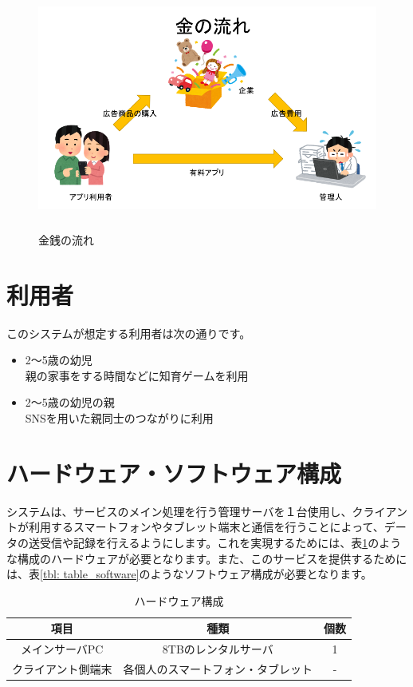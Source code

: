 \documentclass[a4j]{jarticle}
\begin{document}
\begin{figure}[H]
  \begin{center}
    \includegraphics[width = 14cm, height = 8cm]{section5_money.png}
    \caption{金銭の流れ}
    \label{money}
  \end{center}
\end{figure}

\section{利用者}
このシステムが想定する利用者は次の通りです。

\begin{itemize}
\item 2～5歳の幼児\\
  親の家事をする時間などに知育ゲームを利用
\item 2～5歳の幼児の親\\
  SNSを用いた親同士のつながりに利用
\end{itemize}

\section{ハードウェア・ソフトウェア構成}
システムは、サービスのメイン処理を行う管理サーバを１台使用し、クライアントが利用するスマートフォンやタブレット端末と通信を行うことによって、データの送受信や記録を行えるようにします。これを実現するためには、表\ref{tbl: table_hardware}のような構成のハードウェアが必要となります。また、このサービスを提供するためには、表\ref{tbl: table_software}のようなソフトウェア構成が必要となります。

\begin{table}[H]
    \caption{ハードウェア構成}
    \label{tbl: table_hardware}
    \begin{center}
        \begin{tabular}{|c|c|c|} \hline
            項目 & 種類　&  個数\\ \hline \hline
            メインサーバPC & 8TBのレンタルサーバ & 1\\ \hline
            クライアント側端末 & 各個人のスマートフォン・タブレット  & - \\ \hline
        \end{tabular}
    \end{center}
\end{table}
\end{document}
